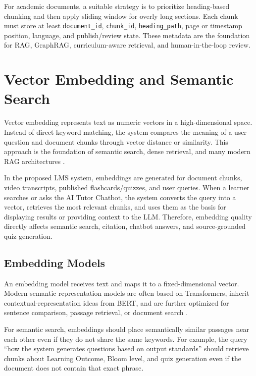 For academic documents, a suitable strategy is to prioritize
heading-based chunking and then apply sliding window for overly long
sections. Each chunk must store at least \texttt{document\_id},
\texttt{chunk\_id}, \texttt{heading\_path}, page or timestamp position,
language, and publish/review state. These metadata are the foundation for
RAG, GraphRAG, curriculum-aware retrieval, and human-in-the-loop review.

\section{Vector Embedding and Semantic Search}
\label{sec:vector-embedding-semantic-search}

Vector embedding represents text as numeric vectors in a high-dimensional
space. Instead of direct keyword matching, the system compares the meaning
of a user question and document chunks through vector distance or
similarity. This approach is the foundation of semantic search, dense
retrieval, and many modern RAG architectures
\cite{karpukhin2020dpr,lewis2020rag}.

In the proposed LMS system, embeddings are generated for document chunks,
video transcripts, published flashcards/quizzes, and user queries. When a
learner searches or asks the AI Tutor Chatbot, the system converts the
query into a vector, retrieves the most relevant chunks, and uses them as
the basis for displaying results or providing context to the LLM.
Therefore, embedding quality directly affects semantic search, citation,
chatbot answers, and source-grounded quiz generation.

\subsection{Embedding Models}
\label{subsec:embedding-models}

An embedding model receives text and maps it to a fixed-dimensional vector.
Modern semantic representation models are often based on Transformers,
inherit contextual-representation ideas from BERT, and are further
optimized for sentence comparison, passage retrieval, or document search
\cite{devlin2019bert,reimers2019sbert}.

For semantic search, embeddings should place semantically similar passages
near each other even if they do not share the same keywords. For example,
the query ``how the system generates questions based on output standards''
should retrieve chunks about Learning Outcome, Bloom level, and quiz
generation even if the document does not contain that exact phrase.

